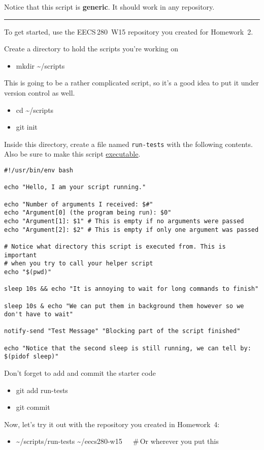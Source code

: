 \documentclass{article}
\begin{document}
\medskip
\noindent
Notice that this script is \textbf{generic}. It should work in any repository.

\bigskip
\hrule
\bigskip

\medskip
\noindent
To get started, use the EECS\,280~W15 repository you created for Homework~2.

\medskip
\noindent
Create a directory to hold the scripts you're working on
\begin{itemize}\tt
  \item mkdir \textasciitilde/scripts
\end{itemize}
This is going to be a rather complicated script, so it's a good
idea to put it under version control as well.
\begin{itemize}\tt
  \item cd \textasciitilde/scripts
  \item git init
\end{itemize}
Inside this directory, create a file named \texttt{run-tests} with the
following contents.  Also be sure to make this script
\href{https://piazza.com/class/ixgsfwif4f35is?cid=35}{executable}.
\begin{lstlisting}
#!/usr/bin/env bash

echo "Hello, I am your script running."

echo "Number of arguments I received: $#"
echo "Argument[0] (the program being run): $0"
echo "Argument[1]: $1" # This is empty if no arguments were passed
echo "Argument[2]: $2" # This is empty if only one argument was passed

# Notice what directory this script is executed from. This is important
# when you try to call your helper script
echo "$(pwd)"

sleep 10s && echo "It is annoying to wait for long commands to finish"

sleep 10s & echo "We can put them in background them however so we don't have to wait"

notify-send "Test Message" "Blocking part of the script finished"

echo "Notice that the second sleep is still running, we can tell by: $(pidof sleep)"
\end{lstlisting}
%
Don't forget to add and commit the starter code
\begin{itemize}\tt
  \item git add run-tests
  \item git commit
\end{itemize}
%
Now, let's try it out with the repository you created in Homework~4:
\begin{itemize}\tt
  \item \textasciitilde/scripts/run-tests \textasciitilde/eecs280-w15~~~\#\,Or wherever you put this
\end{itemize}
\end{document}
